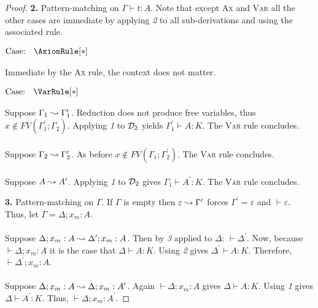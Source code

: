 \begin{proof}
    \noindent \textbf{2.} Pattern-matching on $\Gamma \vdash t : A$.
    Note that except \textsc{Ax} and \textsc{Var} all the other cases are immediate by applying \textit{2} to all sub-derivations and using the associated rule.

    $\text{Case: }\begin{array}{c} \AxiomRule[*] \end{array}$
    \begin{proofcase}
        Immediate by the \textsc{Ax} rule, the context does not matter.
    \end{proofcase}

    $\text{Case: }\begin{array}{c} \VarRule[*] \end{array}$
    \begin{proofcase}
        Suppose $\Gamma_1 \leadsto \Gamma_1^\prime$.
        Reduction does not produce free variables, thus $x \notin FV(\Gamma^\prime_1;\Gamma_2)$.
        Applying \textit{1} to $\mathcal{D}_{2}$ yields $\Gamma^\prime_1 \vdash A : K$.
        The \textsc{Var} rule concludes.
        \\ \\
        Suppose $\Gamma_2 \leadsto \Gamma_2^\prime$.
        As before $x \notin FV(\Gamma_1;\Gamma_2^\prime)$.
        The \textsc{Var} rule concludes.
        \\ \\
        Suppose $A \leadsto A^\prime$.
        Applying \textit{1} to $\mathcal{D}_{2}$ gives $\Gamma_1 \vdash A^\prime : K$.
        The \textsc{Var} rule concludes.
    \end{proofcase}

    \noindent \textbf{3.} Pattern-matching on $\Gamma$.
    If $\Gamma$ is empty then $\varepsilon \leadsto \Gamma^\prime$ forces $\Gamma^\prime = \varepsilon$ and $\vdash \varepsilon$.
    Thus, let $\Gamma = \Delta; x_m : A$.
    \\ \\
    Suppose $\Delta; x_m : A \leadsto \Delta^\prime; x_m : A$.
    Then by \textit{3} applied to $\Delta$: $\vdash \Delta^\prime$.
    Now, because $\vdash \Delta; x_m : A$ it is the case that $\Delta \vdash A : K$.
    Using \textit{2} gives $\Delta^\prime \vdash A : K$.
    Therefore, $\vdash \Delta^\prime; x_m : A$.
    \\ \\
    Suppose $\Delta; x_m : A \leadsto \Delta; x_m : A^\prime$.
    Again $\vdash \Delta; x_m : A$ gives $\Delta \vdash A : K$.
    Using \textit{1} gives $\Delta \vdash A^\prime : K$.
    Thus, $\vdash \Delta; x_m : A^\prime$.
\end{proof}

